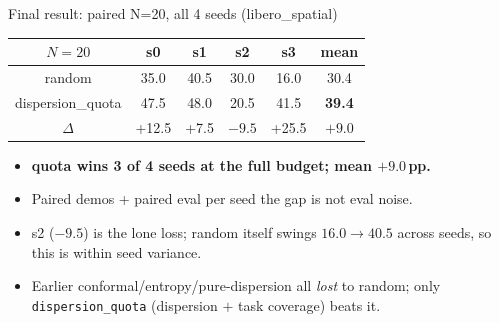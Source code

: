 \documentclass[aspectratio=169]{beamer}
\newcommand{\good}[1]{\textcolor{good}{#1}}
\newcommand{\bad}[1]{\textcolor{bad}{#1}}
\begin{document}
\begin{frame}{Final result: paired N=20, all 4 seeds (libero\_spatial)}
\centering
\begin{tabular}{c|cccc|c}
\toprule
$N{=}20$ & s0 & s1 & s2 & s3 & mean \\
\midrule
random            & 35.0 & 40.5 & 30.0 & 16.0 & 30.4 \\
dispersion\_quota & \good{47.5} & \good{48.0} & \bad{20.5} & \good{41.5} & \good{\textbf{39.4}} \\
\midrule
$\Delta$ & \good{+12.5} & \good{+7.5} & \bad{$-9.5$} & \good{+25.5} & \good{$\mathbf{+9.0}$} \\
\bottomrule
\end{tabular}

\vspace{1.2em}
\begin{itemize}
  \item \textbf{quota wins 3 of 4 seeds at the full budget; mean $+9.0$\,pp.}
  \item Paired demos + paired eval per seed \textemdash{} the gap is not eval noise.
  \item s2 ($-9.5$) is the lone loss; random itself swings $16.0\to40.5$ across seeds, so this is within seed variance.
  \item Earlier conformal/entropy/pure-dispersion all \emph{lost} to random; only \texttt{dispersion\_quota} (dispersion $+$ task coverage) beats it.
\end{itemize}
\end{frame}
\end{document}
